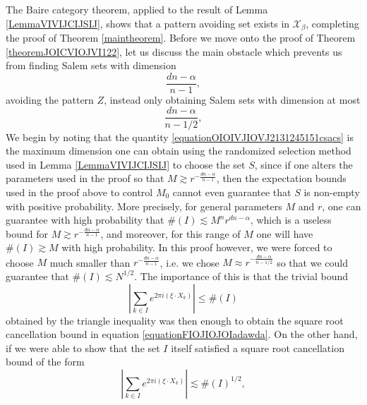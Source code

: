 \documentclass[dvipsnames,letterpaper,12pt]{article}
\numberwithin{equation}{section}
\numberwithin{theorem}{section}
\begin{document}
The Baire category theorem, applied to the result of Lemma \ref{LemmaVIVIJCIJSIJ}, shows that a pattern avoiding set exists in $\mathcal{X}_\beta$, completing the proof of Theorem \ref{maintheorem}. Before we move onto the proof of Theorem \ref{theoremJOICVIOJVI122}, let us discuss the main obstacle which prevents us from finding Salem sets with dimension
%
\begin{equation} \label{equationOIOIVJIOVJ2131245151csacs}
    \frac{dn - \alpha}{n - 1},
\end{equation}
%
avoiding the pattern $Z$, instead only obtaining Salem sets with dimension at most
%
\begin{equation} \label{equationCIONCIOJIOAJ12312}
    \frac{dn - \alpha}{n-1/2},
\end{equation}
%
We begin by noting that the quantity \eqref{equationOIOIVJIOVJ2131245151csacs} is the maximum dimension one can obtain using the randomized selection method used in Lemma \ref{LemmaVIVIJCIJSIJ} to choose the set $S$, since if one alters the parameters used in the proof so that $M \gtrsim r^{-\frac{dn-\alpha}{n-1}}$, then the expectation bounds used in the proof above to control $M_0$ cannot even guarantee that $S$ is non-empty with positive probability. More precisely, for general parameters $M$ and $r$, one can guarantee with high probability that $\#(I) \lesssim M^n r^{dn - \alpha}$, which is a useless bound for $M \gtrsim r^{-\frac{dn-\alpha}{n-1}}$, and moreover, for this range of $M$ one will have $\#(I) \gtrsim M$ with high probability. In this proof however, we were forced to choose $M$ much smaller than $r^{-\frac{dn-\alpha}{n-1}}$, i.e. we chose $M \approx r^{-\frac{dn - \alpha}{n - 1/2}}$ so that we could guarantee that $\#(I) \lesssim N^{1/2}$. The importance of this is that the trivial bound
%
\begin{equation}
    \left| \sum_{k \in I} e^{2 \pi i (\xi \cdot X_k)} \right| \leq \#(I)
\end{equation}
%
obtained by the triangle inequality was then enough to obtain the square root cancellation bound in equation \eqref{equationFIOJIOJOIadawda}. On the other hand, if we were able to show that the set $I$ itself satisfied a square root cancellation bound of the form
%
\begin{equation} \label{equationDOIJCVOIVJOI213123}
    \left| \sum_{k \in I} e^{2 \pi i (\xi \cdot X_k)} \right| \lesssim \#(I)^{1/2},
\end{equation}
%
\end{document}
